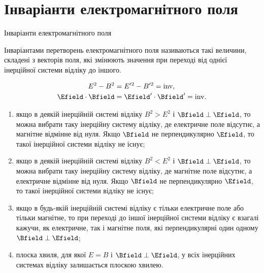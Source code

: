\documentclass[]{beamer}
\begin{document}
\section{Інваріанти електромагнітного поля}



\begin{frame}{Інваріанти електромагнітного поля}{}
	\begin{block}{}\justifying\small
		Інваріантами перетворень електромагнітного поля називаються такі величини, складені з векторів поля, які змінюють значення при переході від однієї інерційної системи відліку до іншого.
	\end{block}
	\begin{tcolorbox}[sharp corners, colframe=blue!50!black, colback=white,  top=0pt]
		{\color{blue}
			\begin{align*}
				E^2 - B^2           & = E'^2 - B'^2 = \mathrm{inv},           \\
				\Efield\cdot\Bfield & = \Efield'\cdot\Bfield' = \mathrm{inv}.
			\end{align*}
		}
	\end{tcolorbox}
	\begin{enumerate}\footnotesize
		\item якщо в деякій інерційній системі відліку {\color{red} $ B^2 > E^2 $}  і {\color{blue} $ \Bfield \perp \Efield $}, то можна вибрати таку інерційну систему відліку, де електричне поле відсутнє, а магнітне відмінне від нуля. Якщо $ \Bfield $ не перпендикулярно $ \Efield $, то такої інерційної системи відліку не існує;
		\item  якщо в деякій інерційній системі відліку {\color{red} $ B^2 < E^2 $} і {\color{blue} $ \Bfield \perp \Efield $}, то можна вибрати таку інерційну систему відліку, де магнітне поле відсутнє, а електричне відмінне від нуля. Якщо $ \Bfield $ не перпендикулярно $ \Efield $, то такої інерційної системи відліку не існує;
		\item якщо в будь-якій інерційній системі відліку є тільки електричне поле або тільки магнітне, то при переході до іншої інерційної системи відліку є взагалі кажучи, як електричне, так і магнітне поля, які перпендикулярні один одному {\color{red} $ \Bfield \perp \Efield $};
		\item плоска хвиля, для якої {\color{red} $ E = B $} і {\color{blue} $ \Bfield \perp \Efield $}, у всіх інерційних системах відліку  залишається плоскою хвилею.
	\end{enumerate}{}


\end{frame}
\end{document}
